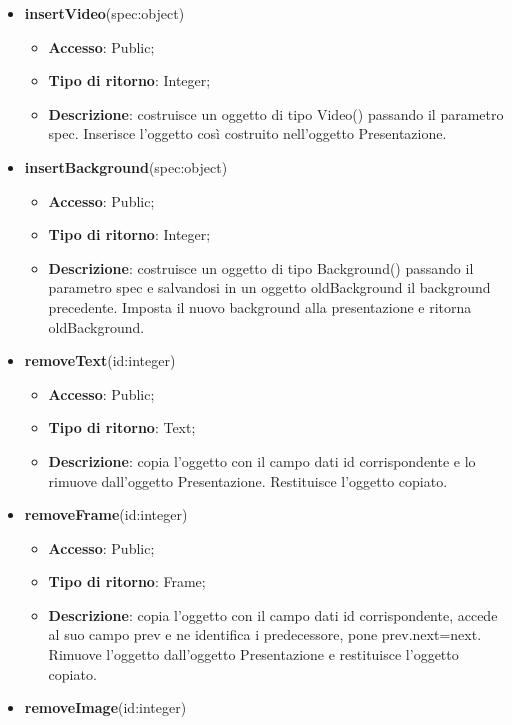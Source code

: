 {\begin{itemize}
\begin{itemize}
			\end{itemize}
			\item \textbf{insertVideo}(spec:object)
			\begin{itemize}
				\item \textbf{Accesso}: Public;
				\item \textbf{Tipo di ritorno}: Integer;
				\item \textbf{Descrizione}: costruisce un oggetto di tipo Video() passando il parametro spec. Inserisce l’oggetto così costruito nell’oggetto Presentazione.
			\end{itemize}
			\item \textbf{insertBackground}(spec:object)
			\begin{itemize}
				\item \textbf{Accesso}: Public;
				\item \textbf{Tipo di ritorno}: Integer;
				\item \textbf{Descrizione}: costruisce un oggetto di tipo Background() passando il parametro spec e salvandosi in un oggetto oldBackground il background precedente. Imposta il nuovo background alla presentazione e ritorna oldBackground.
			\end{itemize}
			\item \textbf{removeText}(id:integer)
			\begin{itemize}
				\item \textbf{Accesso}: Public;
				\item \textbf{Tipo di ritorno}: Text;
				\item \textbf{Descrizione}: copia l’oggetto con il campo dati id corrispondente e lo rimuove dall’oggetto Presentazione. Restituisce l’oggetto copiato.
			\end{itemize}
			\item \textbf{removeFrame}(id:integer)
			\begin{itemize}
				\item \textbf{Accesso}: Public;
				\item \textbf{Tipo di ritorno}: Frame;
				\item \textbf{Descrizione}: copia l’oggetto con il campo dati id corrispondente, accede al suo campo prev e ne identifica i predecessore, pone prev.next=next. Rimuove l’oggetto dall’oggetto Presentazione e restituisce l’oggetto copiato.
			\end{itemize}
			\item \textbf{removeImage}(id:integer)
			\begin{itemize}

\end{itemize}
\end{itemize}}
